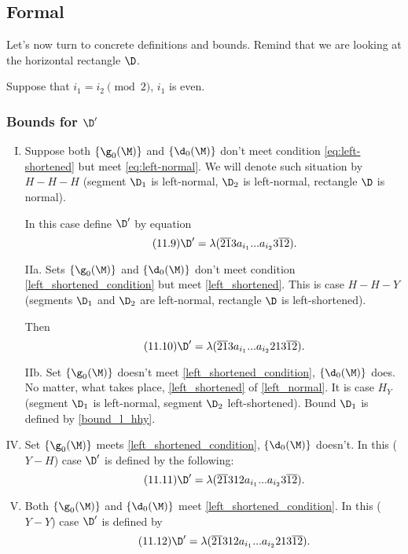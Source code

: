 \subsection{Formal}
\label{sbsc:boundaries_formal}

Let's now turn to concrete definitions and bounds.
Remind that we are looking at the horizontal rectangle $\D$.

Suppose that $i_1 = i_2 \pmod 2$, $i_1$ is even.

\subsubsection{Bounds for $\D'$}

\begin{enumerate}[I.]
	\item Suppose both $\{\g_0(\M)\}$ and $\{\d_0(\M)\}$
	don't meet condition \ref{eq:left-shortened} but meet \ref{eq:left-normal}.
	We will denote such situation by $H-H-H$
	(segment $\D_1$ is left-normal, $\D_2$ is left-normal, rectangle $\D$ is normal).
	
	In this case define $\D'$ by equation
	\begin{equation}\tag{11.9}
		\D' = \lambda(\overline{21}3a_{i_1}... a_{i_2}3\overline{12}).
	\end{equation}
	
	\item[IIa.] Sets $\{\g_0(\M)\}$ and $\{\d_0(\M)\}$
	don't meet condition \ref{left_shortened_condition} but meet \ref{left_shortened}.
	This is case $H-H-Y$
	(segments $\D_1$ and $\D_2$ are left-normal, rectangle $\D$ is left-shortened).
	
	Then
	\begin{equation}\tag{11.10}\label{bound_l_hhy}
		\D' = \lambda(\overline{21}3a_{i_1}... a_{i_2}213\overline{12}).
	\end{equation}
	
	\item[IIb.] Set $\{\g_0(\M)\}$ doesn't meet \ref{left_shortened_condition},
	$\{\d_0(\M)\}$ does.
	No matter, what takes place, \ref{left_shortened} of \ref{left_normal}.
	It is case $H_Y$
	(segment $\D_1$ is left-normal, segment $\D_2$ left-shortened).
	Bound $\D_1$ is defined by \ref{bound_l_hhy}.
	
	\addtocounter{enumi}{1}
	\item Set $\{\g_0(\M)\}$ meets \ref{left_shortened_condition},
	$\{\d_0(\M)\}$ doesn't.
	In this ($Y-H$) case $\D'$ is defined by the following:
	\begin{equation}\tag{11.11}\label{bound_l_yh}
		\D' = \lambda(\overline{21}312a_{i_1}... a_{i_2}3\overline{12}).
	\end{equation}
	
	\item Both $\{\g_0(\M)\}$ and $\{\d_0(\M)\}$
	meet \ref{left_shortened_condition}.
	In this ($Y-Y$) case $\D'$ is defined by
	\begin{equation}\tag{11.12}
		\D' = \lambda(\overline{21}312a_{i_1}... a_{i_2}213\overline{12}).
	\end{equation}
\end{enumerate}


